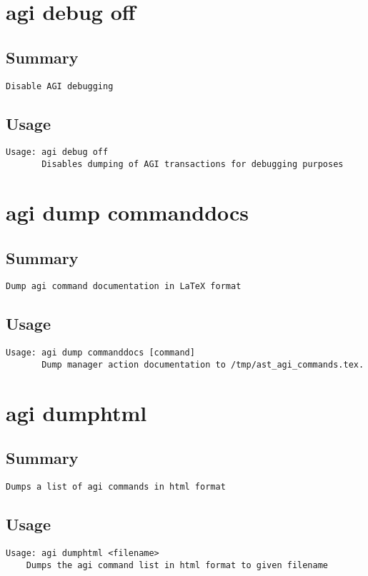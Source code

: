 \section{agi debug off}
\subsection{Summary}
\begin{verbatim}
Disable AGI debugging
\end{verbatim}
\subsection{Usage}
\begin{verbatim}
Usage: agi debug off
       Disables dumping of AGI transactions for debugging purposes

\end{verbatim}


\section{agi dump commanddocs}
\subsection{Summary}
\begin{verbatim}
Dump agi command documentation in LaTeX format
\end{verbatim}
\subsection{Usage}
\begin{verbatim}
Usage: agi dump commanddocs [command]
       Dump manager action documentation to /tmp/ast_agi_commands.tex.

\end{verbatim}


\section{agi dumphtml}
\subsection{Summary}
\begin{verbatim}
Dumps a list of agi commands in html format
\end{verbatim}
\subsection{Usage}
\begin{verbatim}
Usage: agi dumphtml <filename>
	Dumps the agi command list in html format to given filename

\end{verbatim}


